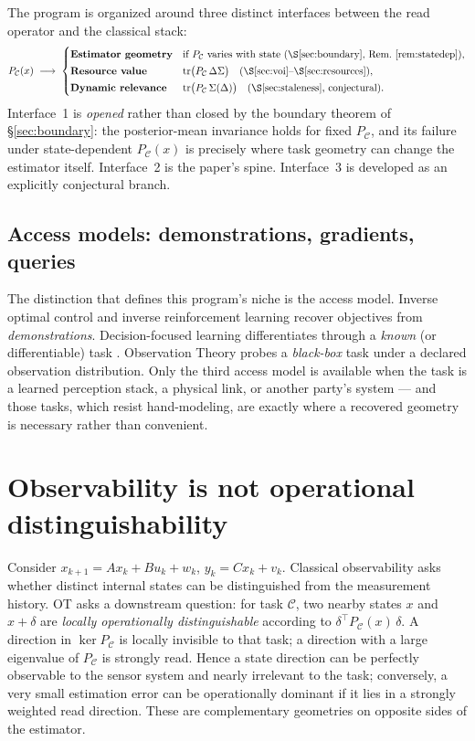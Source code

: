 \documentclass[letterpaper,onecolumn]{IEEEtran}
\theoremstyle{definition}
\theoremstyle{remark}
\newcommand{\PC}{P_{\mathcal{C}}}
\newcommand{\tr}{\operatorname{tr}}
\newcommand{\C}{\mathcal{C}}
\newcommand{\Sig}{\Sigma}
\begin{document}
The program is organized around three distinct interfaces between the read
operator and the classical stack:
\begin{equation}
\label{eq:threeinterfaces}
\PC(x)\;\longrightarrow\;
\begin{cases}
\textbf{Estimator geometry} & \text{if $\PC$ varies with state
  (\S\ref{sec:boundary}, Rem.~\ref{rem:statedep})},\\[2pt]
\textbf{Resource value} & \tr\!\big(\PC\,\Delta\Sig\big)
  \quad\text{(\S\ref{sec:voi}--\S\ref{sec:resources})},\\[2pt]
\textbf{Dynamic relevance} & \tr\!\big(\PC\,\Sig(\Delta)\big)
  \quad\text{(\S\ref{sec:staleness}, conjectural)}.
\end{cases}
\end{equation}
Interface~1 is \emph{opened} rather than closed by the boundary theorem of
\S\ref{sec:boundary}: the posterior-mean invariance holds for fixed $\PC$,
and its failure under state-dependent $\PC(x)$ is precisely where task
geometry can change the estimator itself. Interface~2 is the paper's spine.
Interface~3 is developed as an explicitly conjectural branch.

\subsection{Access models: demonstrations, gradients, queries}
\label{sec:access}

The distinction that defines this program's niche is the access model.
Inverse optimal control and inverse reinforcement learning recover objectives
from \emph{demonstrations}. Decision-focused learning differentiates through
a \emph{known} (or differentiable) task
\cite{elmachtoub2022,amos2017,mandi2024}. Observation Theory probes a
\emph{black-box} task under a declared observation distribution. Only the
third access model is available when the task is a learned perception
stack, a physical link, or another party's system --- and those tasks,
which resist hand-modeling, are exactly where a recovered geometry is
necessary rather than convenient.

\section{Observability is not operational distinguishability}
\label{sec:observability}

Consider $x_{k+1}=Ax_k+Bu_k+w_k$, $y_k=Cx_k+v_k$. Classical observability
asks whether distinct internal states can be distinguished from the
measurement history. OT asks a downstream question: for task $\C$, two
nearby states $x$ and $x+\delta$ are \emph{locally operationally
distinguishable} according to $\delta^{\top}\PC(x)\,\delta$. A direction in
$\ker\PC$ is locally invisible to that task; a direction with a large
eigenvalue of $\PC$ is strongly read. Hence a state direction can be
perfectly observable to the sensor system and nearly irrelevant to the
task; conversely, a very small estimation error can be operationally
dominant if it lies in a strongly weighted read direction. These are
complementary geometries on opposite sides of the estimator.
\end{document}
